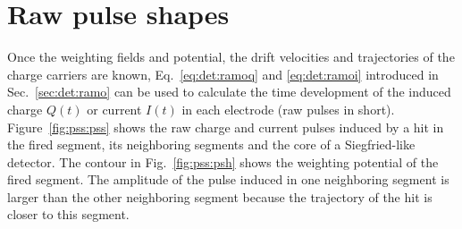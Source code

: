 \section{Raw pulse shapes}
\label{sec:pss:ps}
Once the weighting fields and potential, the drift velocities and trajectories of the charge carriers are known, Eq.~\ref{eq:det:ramoq} and \ref{eq:det:ramoi} introduced in Sec.~\ref{sec:det:ramo} can be used to calculate the time development of the induced charge $Q(t)$ or current $I(t)$ in each electrode (raw pulses in short). Figure~\ref{fig:pss:pss} shows the raw charge and current pulses induced by a hit in the fired segment, its neighboring segments and the core of a Siegfried-like detector. The contour in Fig.~\ref{fig:pss:psh} shows the weighting potential of the fired segment. The amplitude of the pulse induced in one neighboring segment is larger than the other neighboring segment because the trajectory of the hit is closer to this segment.
